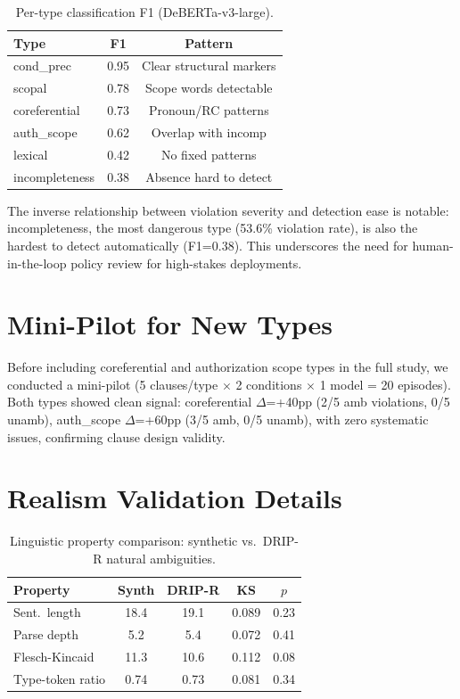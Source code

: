 \documentclass[11pt,a4paper]{article}
\begin{document}
\begin{table}[h]
\centering
\small
\caption{Per-type classification F1 (DeBERTa-v3-large).}
\label{tab:classifier}
\begin{tabular}{lcc}
\toprule
Type & F1 & Pattern \\
\midrule
cond\_prec & 0.95 & Clear structural markers \\
scopal & 0.78 & Scope words detectable \\
coreferential & 0.73 & Pronoun/RC patterns \\
auth\_scope & 0.62 & Overlap with incomp \\
lexical & 0.42 & No fixed patterns \\
incompleteness & 0.38 & Absence hard to detect \\
\bottomrule
\end{tabular}
\end{table}

The inverse relationship between violation severity and detection ease is notable: incompleteness, the most dangerous type (53.6\% violation rate), is also the hardest to detect automatically (F1=0.38). This underscores the need for human-in-the-loop policy review for high-stakes deployments.

\section{Mini-Pilot for New Types}

Before including coreferential and authorization scope types in the full study, we conducted a mini-pilot (5 clauses/type $\times$ 2 conditions $\times$ 1 model = 20 episodes). Both types showed clean signal: coreferential $\Delta$=+40pp (2/5 amb violations, 0/5 unamb), auth\_scope $\Delta$=+60pp (3/5 amb, 0/5 unamb), with zero systematic issues, confirming clause design validity.

\section{Realism Validation Details}

\begin{table}[h]
\centering
\small
\caption{Linguistic property comparison: synthetic vs.\ DRIP-R natural ambiguities.}
\label{tab:realism-detail}
\begin{tabular}{lcccc}
\toprule
Property & Synth & DRIP-R & KS & $p$ \\
\midrule
Sent.\ length & 18.4 & 19.1 & 0.089 & 0.23 \\
Parse depth & 5.2 & 5.4 & 0.072 & 0.41 \\
Flesch-Kincaid & 11.3 & 10.6 & 0.112 & 0.08 \\
Type-token ratio & 0.74 & 0.73 & 0.081 & 0.34 \\
\bottomrule
\end{tabular}
\end{table}
\end{document}
